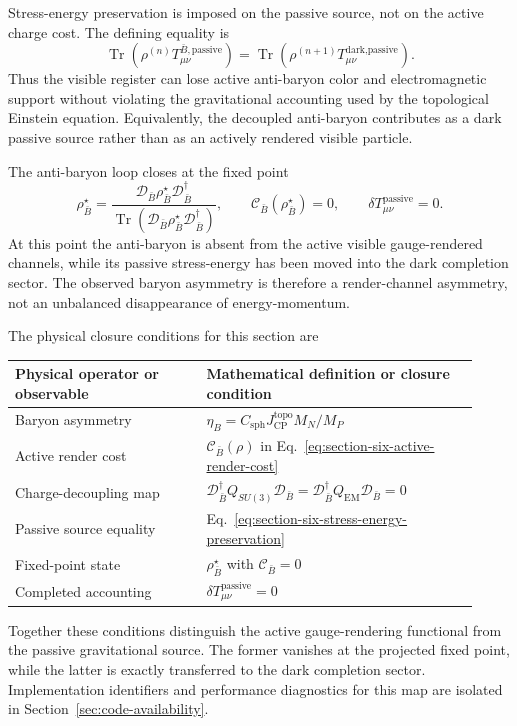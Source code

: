 \documentclass[11pt,letterpaper]{article}
\theoremstyle{plain}
\DeclareMathOperator{\Tr}{Tr}
\newcommand{\MP}{M_P}
\begin{document}
Stress-energy preservation is imposed on the passive source, not on the active
charge cost.  The defining equality is
\begin{equation}
\label{eq:section-six-stress-energy-preservation}
 \boxed{
 \Tr\!\left(\rho^{(n)}T_{\mu\nu}^{\bar B,\text{passive}}\right)
 =
 \Tr\!\left(\rho^{(n+1)}T_{\mu\nu}^{\text{dark},\text{passive}}\right).
 }
\end{equation}
Thus the visible register can lose active anti-baryon color and electromagnetic
support without violating the gravitational accounting used by the topological
Einstein equation.  Equivalently, the decoupled anti-baryon contributes as a
dark passive source rather than as an actively rendered visible particle.

The anti-baryon loop closes at the fixed point
\begin{equation}
\label{eq:section-six-antibaryon-fixed-point}
 \boxed{
 \rho_{\bar B}^{\star}
 =
 \frac{
 \mathcal D_{\bar B}\rho_{\bar B}^{\star}\mathcal D_{\bar B}^{\dagger}}
 {\Tr\!\left(
 \mathcal D_{\bar B}\rho_{\bar B}^{\star}\mathcal D_{\bar B}^{\dagger}
 \right)},
 \qquad
 \mathcal C_{\bar B}(\rho_{\bar B}^{\star})=0,
 \qquad
 \delta T_{\mu\nu}^{\text{passive}}=0.
 }
\end{equation}
At this point the anti-baryon is absent from the active visible gauge-rendered
channels, while its passive stress-energy has been moved into the dark
completion sector.  The observed baryon asymmetry is therefore a render-channel
asymmetry, not an unbalanced disappearance of energy-momentum.

The physical closure conditions for this section are
\begin{center}
\small
\begin{tabular}{@{}L{0.38\linewidth}L{0.54\linewidth}@{}}
\toprule
Physical operator or observable & Mathematical definition or closure condition \\
\midrule
Baryon asymmetry & $\eta_B=C_{\text{sph}}J_{\text{CP}}^{\text{topo}}M_N/\MP$ \\
Active render cost & $\mathcal C_{\bar B}(\rho)$ in Eq.~\eqref{eq:section-six-active-render-cost} \\
Charge-decoupling map & $\mathcal D_{\bar B}^{\dagger}Q_{SU(3)}\mathcal D_{\bar B}=\mathcal D_{\bar B}^{\dagger}Q_{\text{EM}}\mathcal D_{\bar B}=0$ \\
Passive source equality & Eq.~\eqref{eq:section-six-stress-energy-preservation} \\
Fixed-point state & $\rho_{\bar B}^{\star}$ with $\mathcal C_{\bar B}=0$ \\
Completed accounting & $\delta T_{\mu\nu}^{\text{passive}}=0$ \\
\bottomrule
\end{tabular}
\end{center}
Together these conditions distinguish the active gauge-rendering functional
from the passive gravitational source.  The former vanishes at the projected
fixed point, while the latter is exactly transferred to the dark completion
sector.  Implementation identifiers and performance diagnostics for this map
are isolated in Section~\ref{sec:code-availability}.
\end{document}
